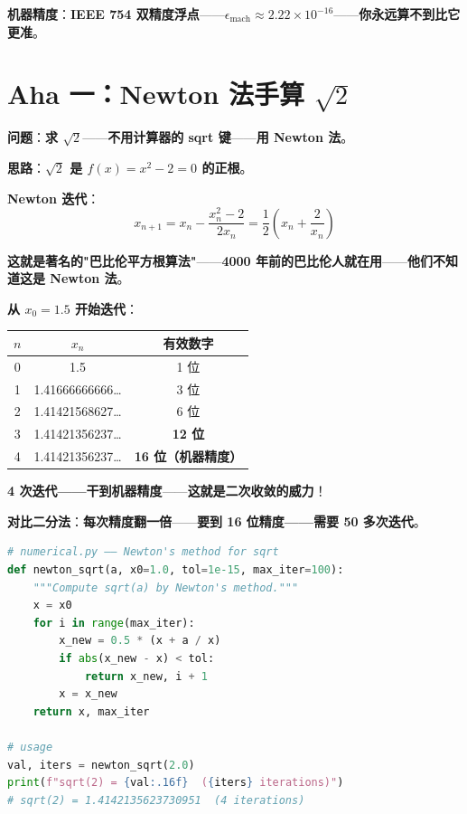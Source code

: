 \textbf{机器精度}：\textbf{IEEE 754 双精度浮点}——\textbf{$\epsilon_{\text{mach}} \approx 2.22 \times 10^{-16}$}——\textbf{你永远算不到比它更准}。

\section{Aha 一：Newton 法手算 $\sqrt{2}$}

\textbf{问题}：\textbf{求 $\sqrt{2}$}——\textbf{不用计算器的 sqrt 键}——\textbf{用 Newton 法}。

\textbf{思路}：\textbf{$\sqrt{2}$ 是 $f(x) = x^2 - 2 = 0$ 的正根}。

\textbf{Newton 迭代}：
\begin{equation}
x_{n+1} = x_n - \frac{x_n^2 - 2}{2 x_n} = \frac{1}{2} \left( x_n + \frac{2}{x_n} \right)
\end{equation}

\textbf{这就是著名的"巴比伦平方根算法"}——\textbf{4000 年前的巴比伦人就在用}——\textbf{他们不知道这是 Newton 法}。

\textbf{从 $x_0 = 1.5$ 开始迭代}：

\begin{center}
\begin{tabular}{ccc}
\toprule
$n$ & $x_n$ & 有效数字 \\
\midrule
0 & 1.5 & 1 位 \\
1 & 1.41666666666\ldots & 3 位 \\
2 & 1.41421568627\ldots & 6 位 \\
3 & 1.41421356237\ldots & \textbf{12 位} \\
4 & 1.41421356237\ldots & \textbf{16 位（机器精度）} \\
\bottomrule
\end{tabular}
\end{center}

\textbf{4 次迭代——干到机器精度}——\textbf{这就是二次收敛的威力}！

\textbf{对比二分法}：\textbf{每次精度翻一倍}——\textbf{要到 16 位精度——需要 50 多次迭代}。

\begin{lstlisting}[language=Python]
# numerical.py —— Newton's method for sqrt
def newton_sqrt(a, x0=1.0, tol=1e-15, max_iter=100):
    """Compute sqrt(a) by Newton's method."""
    x = x0
    for i in range(max_iter):
        x_new = 0.5 * (x + a / x)
        if abs(x_new - x) < tol:
            return x_new, i + 1
        x = x_new
    return x, max_iter

# usage
val, iters = newton_sqrt(2.0)
print(f"sqrt(2) = {val:.16f}  ({iters} iterations)")
# sqrt(2) = 1.4142135623730951  (4 iterations)
\end{lstlisting}

